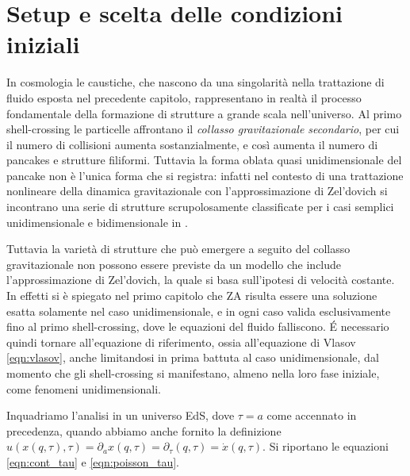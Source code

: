 \section{Setup e scelta delle condizioni iniziali}

In cosmologia le caustiche, che nascono da una singolarità nella trattazione di fluido esposta nel precedente
capitolo, rappresentano in realtà il processo fondamentale della formazione di strutture a grande scala 
nell'universo. Al primo shell-crossing le particelle affrontano il \textit{collasso gravitazionale
secondario}, per cui il numero di collisioni aumenta sostanzialmente, e così aumenta il numero di pancakes e 
strutture filiformi. Tuttavia la forma oblata quasi unidimensionale del pancake non è l'unica forma che si 
registra: infatti nel contesto di una trattazione nonlineare della dinamica gravitazionale con l'approssimazione
di Zel'dovich si incontrano una serie di strutture scrupolosamente classificate per i casi semplici unidimensionale
e bidimensionale in \cite{arnold}.

Tuttavia la varietà di strutture che può emergere a seguito del collasso gravitazionale non possono essere previste 
da un modello che include l'approssimazione di Zel'dovich, la quale si basa sull'ipotesi di velocità costante.
In effetti si è spiegato nel primo capitolo che ZA risulta essere una soluzione esatta solamente nel caso 
unidimensionale, e in ogni caso valida esclusivamente fino al primo shell-crossing, dove le equazioni del
fluido falliscono. \'E necessario quindi tornare all'equazione di riferimento, ossia all'equazione di Vlasov 
\ref{eqn:vlasov}, anche limitandosi in prima battuta al caso unidimensionale, dal momento che gli 
shell-crossing si manifestano, almeno nella loro fase iniziale, come fenomeni unidimensionali.

Inquadriamo l'analisi in un universo EdS, dove $\tau = a$ come accennato in precedenza, quando abbiamo anche
fornito la definizione $u(x(q, \tau), \tau) = \partial_a x(q, \tau) = \partial_{\tau}(q, \tau) = \dot{x}(q, \tau)$.
Si riportano le equazioni \ref{eqn:cont_tau} e \ref{eqn:poisson_tau}.

